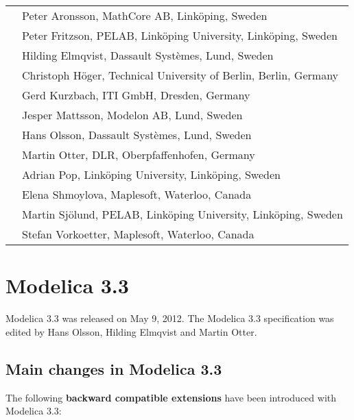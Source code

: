 \documentclass[../MLS.tex]{subfiles}
\begin{document}
\begin{longtable}{p{0.3cm}p{14cm}}
&Peter Aronsson, MathCore AB, Linköping, Sweden\\
&Peter Fritzson, PELAB, Linköping University, Linköping, Sweden\\
&Hilding Elmqvist, Dassault Systèmes, Lund, Sweden\\
&Christoph Höger, Technical University of Berlin, Berlin, Germany\\
&Gerd Kurzbach, ITI GmbH, Dresden, Germany\\
&Jesper Mattsson, Modelon AB, Lund, Sweden\\
&Hans Olsson, Dassault Systèmes, Lund, Sweden\\
&Martin Otter, DLR, Oberpfaffenhofen, Germany\\
&Adrian Pop, Linköping University, Linköping, Sweden\\
&Elena Shmoylova, Maplesoft, Waterloo, Canada\\
&Martin Sjölund, PELAB, Linköping University, Linköping, Sweden\\
&Stefan Vorkoetter, Maplesoft, Waterloo, Canada
\end{longtable}

\section{Modelica 3.3}

Modelica 3.3 was released on May 9, 2012. The Modelica 3.3 specification
was edited by Hans Olsson, Hilding Elmqvist and Martin Otter.

\subsection{Main changes in Modelica 3.3}

The following \textbf{backward compatible extensions} have been
introduced with Modelica 3.3:
\end{document}
